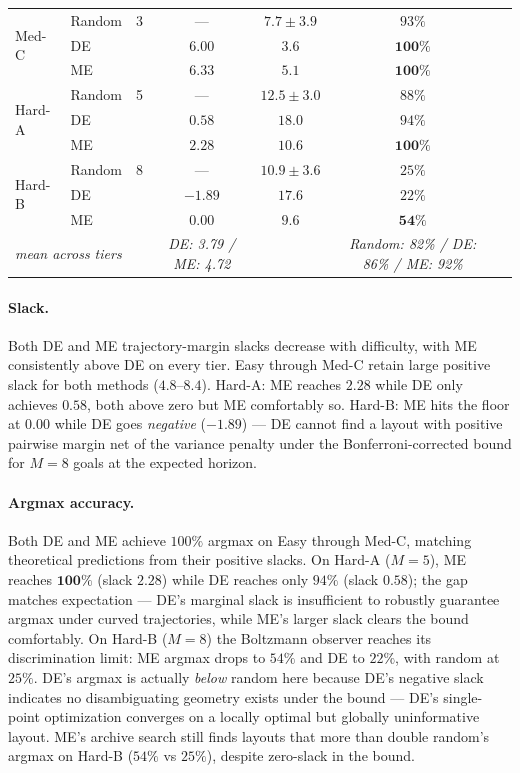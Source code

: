 \documentclass[letterpaper, 10pt, conference]{ieeeconf}
\begin{document}
\begin{table}[t]
\begin{tabular}{@{}llccccc@{}}
\midrule
\multirow{3}{*}{Med-C}
  & Random    & 3 & ---             & $7.7 \pm 3.9$ & $93\%$ \\
  & DE        &   & $6.00$          & $\mathbf{3.6}$ & $\mathbf{100\%}$ \\
  & ME        &   & $\mathbf{6.33}$ & $5.1$          & $\mathbf{100\%}$ \\
\midrule
\multirow{3}{*}{Hard-A}
  & Random    & 5 & ---             & $12.5 \pm 3.0$ & $88\%$ \\
  & DE        &   & $0.58$          & $18.0$         & $94\%$ \\
  & ME        &   & $\mathbf{2.28}$ & $\mathbf{10.6}$ & $\mathbf{100\%}$ \\
\midrule
\multirow{3}{*}{Hard-B}
  & Random    & 8 & ---             & $10.9 \pm 3.6$ & $25\%$ \\
  & DE        &   & $-1.89$         & $17.6$         & $22\%$ \\
  & ME        &   & $\mathbf{0.00}$ & $\mathbf{9.6}$ & $\mathbf{54\%}$ \\
\midrule
\multicolumn{2}{l}{\textit{mean across tiers}} & & \textit{DE: 3.79 / ME: 4.72} & & \textit{Random: 82\% / DE: 86\% / ME: 92\%} \\
\bottomrule
\end{tabular}
\end{table}

\paragraph{Slack.}
Both DE and ME trajectory-margin slacks decrease with difficulty,
with ME consistently above DE on every tier. Easy through Med-C
retain large positive slack for both methods ($4.8$--$8.4$).
Hard-A: ME reaches $2.28$ while DE only achieves $0.58$, both
above zero but ME comfortably so. Hard-B: ME hits the floor at
$0.00$ while DE goes \emph{negative} ($-1.89$) --- DE cannot find a
layout with positive pairwise margin net of the variance penalty
under the Bonferroni-corrected bound for $M{=}8$ goals at the
expected horizon.

\paragraph{Argmax accuracy.}
Both DE and ME achieve $100\%$ argmax on Easy through Med-C,
matching theoretical predictions from their positive slacks.  On
Hard-A ($M{=}5$), ME reaches $\mathbf{100\%}$ (slack $2.28$) while
DE reaches only $94\%$ (slack $0.58$); the gap matches expectation
--- DE's marginal slack is insufficient to robustly guarantee
argmax under curved trajectories, while ME's larger slack clears
the bound comfortably. On Hard-B ($M{=}8$) the Boltzmann observer
reaches its discrimination limit: ME argmax drops to $54\%$ and DE
to $22\%$, with random at $25\%$. DE's argmax is actually
\emph{below} random here because DE's negative slack indicates no
disambiguating geometry exists under the bound --- DE's single-point
optimization converges on a locally optimal but globally uninformative
layout. ME's archive search still finds layouts that more than
double random's argmax on Hard-B ($54\%$ vs $25\%$), despite
zero-slack in the bound.
\end{document}
